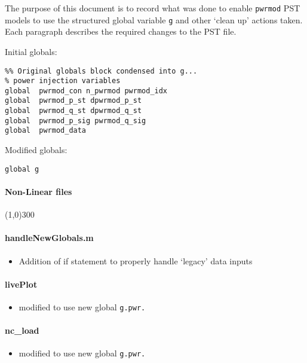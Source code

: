 \documentclass[12pt]{article}
\begin{document}
The purpose of this document is to record what was done to enable \verb|pwrmod| PST models to use the structured global variable \verb|g| and other `clean up' actions taken. \\
Each paragraph describes the required changes to the PST file.

Initial globals:
\begin{verbatim}
%% Original globals block condensed into g...
% power injection variables
global  pwrmod_con n_pwrmod pwrmod_idx
global  pwrmod_p_st dpwrmod_p_st
global  pwrmod_q_st dpwrmod_q_st
global  pwrmod_p_sig pwrmod_q_sig
global  pwrmod_data

\end{verbatim}

Modified globals:
\begin{verbatim}
global g
\end{verbatim}
\paragraph{Non-Linear files}\line(1,0){300}
\paragraph{handleNewGlobals.m}
	\begin{itemize}
		\item Addition of if statement to properly handle `legacy' data inputs
	\end{itemize}
\paragraph{livePlot}
	\begin{itemize}
		\item modified to use new global \verb|g.pwr.|
	\end{itemize}
\paragraph{nc\_load}
	\begin{itemize}
		\item modified to use new global \verb|g.pwr.|
	\end{itemize}

\end{document}
